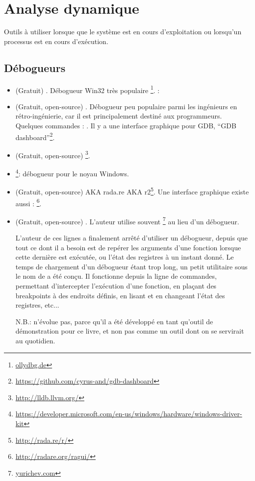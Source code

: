 \section{Analyse dynamique}

Outils à utiliser lorsque que le système est en cours d'exploitation ou lorsqu'un processus est en cours d'exécution.

\subsection{Débogueurs}

\myindex{\olly}

\begin{itemize}
\item (Gratuit) .
Débogueur Win32 très populaire \footnote{\href{http://go.yurichev.com/17032}{ollydbg.de}}.
\ShortHotKeyCheatsheet: 

\item (Gratuit, open-source) .
Débogueur peu populaire parmi les ingénieurs en rétro-ingénierie, car il est principalement destiné aux programmeurs.
Quelques commandes : .
Il y a une interface graphique pour GDB, ``GDB dashboard''\footnote{\url{https://github.com/cyrus-and/gdb-dashboard}}.

\item (Gratuit, open-source) \footnote{\url{http://lldb.llvm.org/}}.

\item {}\footnote{\url{https://developer.microsoft.com/en-us/windows/hardware/windows-driver-kit}}:
débogueur pour le noyau Windows.

\item (Gratuit, open-source)  \ac{AKA} rada.re \ac{AKA} r2\footnote{\url{http://rada.re/r/}}.
Une interface graphique existe aussi : \footnote{\url{http://radare.org/ragui/}}.

\item (Gratuit, open-source) .
\label{tracer}
L'auteur utilise souvent 
\footnote{\href{http://go.yurichev.com/17338}{yurichev.com}}
au lieu d'un débogueur.

L'auteur de ces lignes a finalement arrêté d'utiliser un débogueur, depuis que tout ce dont il a besoin est de repérer les arguments d'une fonction lorsque cette dernière est exécutée, ou l'état des registres à un instant donné.
Le temps de chargement d'un débogueur étant trop long, un petit utilitaire sous le nom de  a été conçu.
Il fonctionne depuis la ligne de commandes, permettant d'intercepter l'exécution d'une fonction,
en plaçant des breakpoints à des endroits définis, en lisant et en changeant l'état des registres, etc...

N.B.:  n'évolue pas, parce qu'il a été développé en tant qu'outil de démonstration pour ce livre, et non pas comme un outil dont on se servirait au quotidien.
\end{itemize}

